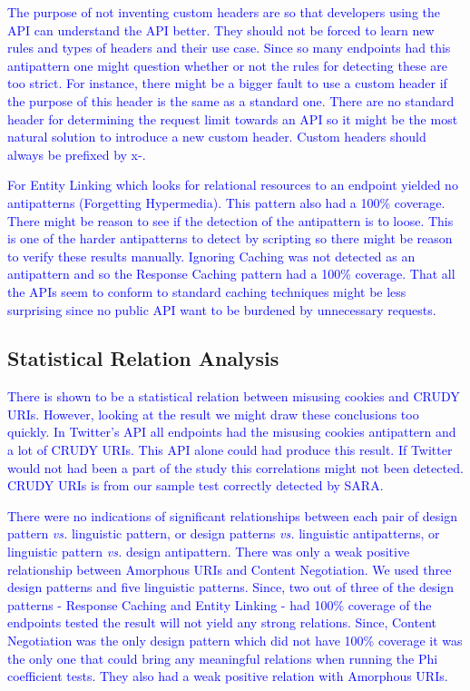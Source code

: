 \textcolor{blue}{The purpose of not inventing custom headers are so that developers using the API can understand the API better. They should not be forced to learn new rules and types of headers and their use case. Since so many endpoints had this antipattern one might question whether or not the rules for detecting these are too strict. For instance, there might be a bigger fault to use a custom header if the purpose of this header is the same as a standard one. There are no standard header for determining the request limit towards an API so it might be the most natural solution to introduce a new custom header. Custom headers should always be prefixed by x-. }

\textcolor{blue}{For Entity Linking which looks for relational resources to an endpoint yielded no antipatterns (Forgetting Hypermedia). This pattern also had a 100\% coverage. There might be reason to see if the detection of the antipattern is to loose. This is one of the harder antipatterns to detect by scripting so there might be reason to verify these results manually. Ignoring Caching was not detected as an antipattern and so the Response Caching pattern had a 100\% coverage. That all the APIs seem to conform to standard caching techniques might be less surprising since no public API want to be burdened by unnecessary requests. }

\subsection{Statistical Relation Analysis}
\label{StatisticalRelationAnalysis}

\textcolor{blue}{There is shown to be a statistical relation between misusing cookies and CRUDY URIs. However, looking at the result we might draw these conclusions too quickly. In Twitter's API all endpoints had the misusing cookies antipattern and a lot of CRUDY URIs. This API alone could had produce this result. If Twitter would not had been a part of the study this correlations might not been detected. CRUDY URIs is from our sample test correctly detected by SARA.}

\textcolor{blue}{There were no indications of significant relationships between each pair of design pattern \textit{vs.} linguistic pattern, or design patterns \textit{vs.} linguistic antipatterns, or linguistic pattern \textit{vs.} design antipattern. There was only a weak positive relationship between Amorphous URIs and Content Negotiation. We used three design patterns and five linguistic patterns. Since, two out of three of the design patterns - Response Caching and Entity Linking - had 100\% coverage of the endpoints tested the result will not yield any strong relations. Since, Content Negotiation was the only design pattern which did not have 100\% coverage it was the only one that could bring any meaningful relations when running the Phi coefficient tests. They also had a weak positive relation with Amorphous URIs.}

